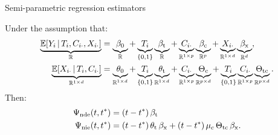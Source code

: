 \documentclass[aspectratio=169]{beamer}
\theoremstyle{remark}
\begin{document}


%     



\begin{frame}{Semi-parametric regression estimators}

    Under the assumption that:
    \begin{equation*}
        \begin{aligned}
            \underbrace{\E[T_i, \C_{i \cdot}, \X_{i \cdot}]{Y_i}}_{\R}
             & = \underbrace{\betazero}_{\R}
            + \underbrace{T_i}_{\{0, 1\}} \underbrace{\betat}_{\R}
            + \underbrace{\C_{i \cdot}}_{\R^{1 \times p}} \underbrace{\betac}_{\R^{p}}
            + \underbrace{\X_{i \cdot}}_{\R^{1 \times d}} \underbrace{\betax}_{\R^d}, \\
            \underbrace{\E[T_i, \C_{i \cdot}]{\X_{i \cdot}}}_{\R^{1 \times d}}
             & = \underbrace{\thetazero}_{\R^{1 \times d}}
            + \underbrace{T_i}_{\{0, 1\}} \underbrace{\thetat}_{\R^{1 \times d}}
            + \underbrace{\C_{i \cdot}}_{\R^{1 \times p}} \underbrace{\Thetac}_{\R^{p \times d}}
            + \underbrace{T_i}_{\{0, 1\}} \underbrace{\C_{i \cdot}}_{\R^{1 \times p}} \underbrace{\Thetatc}_{\R^{p \times d}}.
        \end{aligned}
    \end{equation*}
    Then:
    \begin{align*}
        \ndef & = \paren*{t - t^*} \, \betat                                                        \\
        \nief & = \paren*{t - t^*} \, \thetat \, \betax + (t - t^*) \, \mu_c \, \Thetatc \, \betax.
    \end{align*}

\end{frame}



\end{document}
